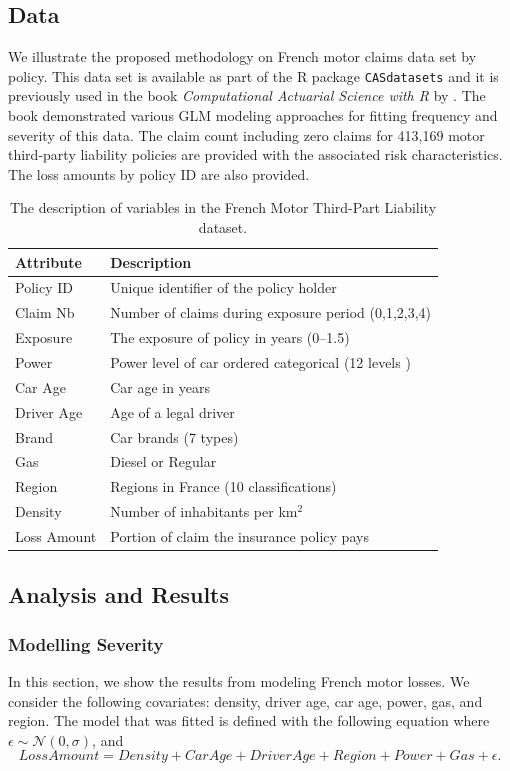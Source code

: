 \documentclass[11pt,letterpaper]{article}
\numberwithin{equation}{section}
\numberwithin{equation}{section}
\numberwithin{equation}{section}
\begin{document}
\subsection{Data}
We illustrate the proposed methodology on French motor claims data set by policy. This data set is available as part of the R package {\tt CASdatasets} and it is previously used in the book {\it Computational Actuarial Science with R}  by \cite{Charpentier:2014}.
The book demonstrated various GLM modeling approaches for fitting frequency and severity of this data. The claim count including zero claims for 413,169 motor third-party liability policies are provided with the associated risk characteristics. The loss amounts by policy ID are also provided. 
\begin{small}
\begin{table}[!htb]
\begin{center}
    \caption{The description of variables in the French Motor Third-Part Liability dataset.} 
      \centering
        \begin{tabular}{ll}
\hline
Attribute & Description \\
\hline
Policy ID & Unique identifier of the policy holder\\
Claim Nb & Number of claims during exposure period  (0,1,2,3,4)\\
Exposure & The exposure of policy in years (0--1.5) \\
Power & Power level of car ordered categorical (12 levels )\\
Car Age & Car age in years \\
Driver Age & Age of a legal driver \\
Brand & Car brands (7 types) \\
Gas & Diesel or Regular \\
Region & Regions in France (10 classifications)\\
Density & Number of inhabitants per km$^2$ \\
Loss Amount & Portion of claim the insurance policy pays\\
\hline
		\end{tabular}
\end{center}
\end{table}
\end{small}
\subsection{Analysis and Results}
\subsubsection{Modelling Severity}
In this section, we show the results from modeling French motor losses. We consider the following covariates: density, driver age, car age, power, gas,  and region. %
The model that was fitted is defined with the following equation where $\epsilon \sim \mathcal{N}(0,\sigma)$, and
\begin{equation}
Loss Amount =  Density + Car Age + Driver Age + Region + Power + Gas + \epsilon. \label{regressionModel}
\end{equation}
\end{document}

